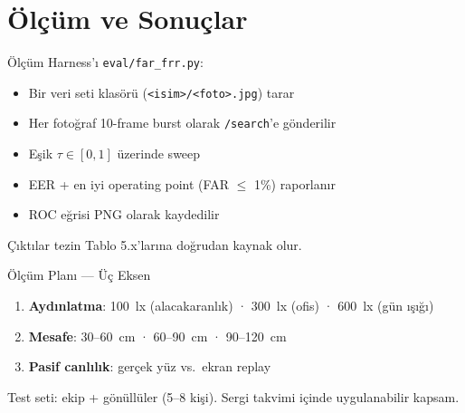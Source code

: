 \documentclass[aspectratio=169,12pt]{beamer}
\begin{document}
\section{Ölçüm ve Sonuçlar}

\begin{frame}{Ölçüm Harness'ı}
    \texttt{eval/far\_frr.py}:
    \begin{itemize}
        \item Bir veri seti klasörü (\texttt{<isim>/<foto>.jpg}) tarar
        \item Her fotoğraf 10-frame burst olarak \texttt{/search}'e gönderilir
        \item Eşik $\tau \in [0, 1]$ üzerinde sweep
        \item EER + en iyi operating point (FAR $\leq$ 1\%) raporlanır
        \item ROC eğrisi PNG olarak kaydedilir
    \end{itemize}

    \vspace{0.3cm}
    Çıktılar tezin Tablo 5.x'larına doğrudan kaynak olur.
\end{frame}

\begin{frame}{Ölçüm Planı --- Üç Eksen}
    \begin{enumerate}
        \item \textbf{Aydınlatma}:
              100~lx (alacakaranlık) · 300~lx (ofis) · 600~lx (gün ışığı)
        \item \textbf{Mesafe}:
              30--60~cm · 60--90~cm · 90--120~cm
        \item \textbf{Pasif canlılık}:
              gerçek yüz vs.\ ekran replay
    \end{enumerate}

    \vspace{0.3cm}
    Test seti: ekip + gönüllüler (5--8 kişi).
    Sergi takvimi içinde uygulanabilir kapsam.
\end{frame}
\end{document}
